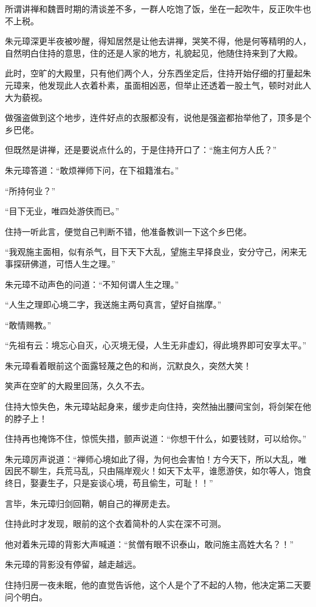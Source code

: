 \begin{multicols}{\theparacolNo}
		所谓讲禅和魏晋时期的清谈差不多，一群人吃饱了饭，坐在一起吹牛，反正吹牛也不上税。

		朱元璋深更半夜被吵醒，得知居然是让他去讲禅，哭笑不得，他是何等精明的人，自然明白住持的意思，住的还是人家的地方，礼貌起见，他随住持来到了大殿。

		此时，空旷的大殿里，只有他们两个人，分东西坐定后，住持开始仔细的打量起朱元璋来，他发现此人衣着朴素，虽面相凶恶，但举止还透着一股土气，顿时对此人大为藐视。

		做强盗做到这个地步，连件好点的衣服都没有，说他是强盗都抬举他了，顶多是个乡巴佬。

		但既然是讲禅，还是要说点什么的，于是住持开口了：“施主何方人氏？”

		朱元璋答道：“敢烦禅师下问，在下祖籍淮右。”

		“所持何业？”

		“目下无业，唯四处游侠而已。”

		住持一听此言，便觉自己判断不错，他准备教训一下这个乡巴佬。

		“我观施主面相，似有杀气，目下天下大乱，望施主早择良业，安分守己，闲来无事探研佛道，可悟人生之理。”

		朱元璋不动声色的问道：“不知何谓人生之理。”

		“人生之理即心境二字，我送施主两句真言，望好自揣摩。”

		“敢情赐教。”

		“先祖有云：境忘心自灭，心灭境无侵，人生无非虚幻，得此境界即可安享太平。”

		朱元璋看着眼前这个面露轻蔑之色的和尚，沉默良久，突然大笑！

		笑声在空旷的大殿里回荡，久久不去。

		住持大惊失色，朱元璋站起身来，缓步走向住持，突然抽出腰间宝剑，将剑架在他的脖子上！

		住持再也掩饰不住，惊慌失措，颤声说道：“你想干什么，如要钱财，可以给你。”

		朱元璋厉声说道：“禅师心境如此了得，为何也会害怕！方今天下，所以大乱，唯因民不聊生，兵荒马乱，只由隔岸观火！如天下太平，谁愿游侠，如尔等人，饱食终日，娶妻生子，只是妄谈心境，苟且偷生，可耻！！”

		言毕，朱元璋归剑回鞘，朝自己的禅房走去。

		住持此时才发现，眼前的这个衣着简朴的人实在深不可测。

		他对着朱元璋的背影大声喊道：“贫僧有眼不识泰山，敢问施主高姓大名？！”

		朱元璋的背影没有停留，越走越远。

		住持归房一夜未眠，他的直觉告诉他，这个人是个了不起的人物，他决定第二天要问个明白。


\end{multicols}
